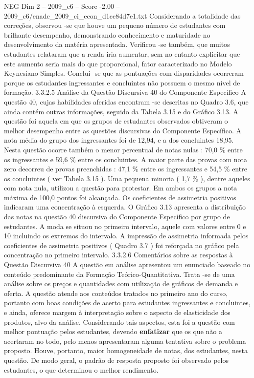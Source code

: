 \begin{textsample}{NEG Dim 2 – 2009\_c6 – Score -2.00 – 2009\_c6/enade\_2009\_ci\_econ\_d1cc84d7e1.txt}
Considerando a totalidade das correções, observou -se que houve um pequeno número de estudantes com brilhante desempenho, demonstrando conhecimento e maturidade no desenvolvimento da matéria apresentada.
Verificou -se também, que muitos estudantes relataram que a renda iria aumentar, sem no entanto explicitar que este aumento seria mais do que proporcional, fator caracterizado no Modelo Keynesiano Simples.
Conclui -se que as pontuações com disparidades ocorreram porque os estudantes ingressantes e concluintes não possuem o mesmo nível de formação. 3.3.2.5 Análise da Questão Discursiva 40 do Componente Específico A questão 40, cujas habilidades aferidas encontram -se descritas no Quadro 3.6, que ainda contém outras informações, seguido da Tabela 3.15 e do Gráfico 3.13.
A questão foi aquela em que os grupos de estudantes observados obtiveram o melhor desempenho entre as questões discursivas do Componente Específico.
A nota média do grupo dos ingressantes foi de 12,94, e a dos concluintes 18,95.
Nesta questão ocorre também o menor percentual de notas nulas : 70,0 \% entre os ingressantes e 59,6 \% entre os concluintes.
A maior parte das provas com nota zero decorreu de provas preenchidas : 47,1 \% entre os ingressantes e 54,5 \% entre os concluintes ( ver Tabela 3.15 ).
Uma pequena minoria ( 1,7 \% ), dentre aqueles com nota nula, utilizou a questão para protestar.
Em ambos os grupos a nota máxima de 100,0 pontos foi alcançada.
Os coeficientes de assimetria positivos indicaram uma concentração à esquerda.
O Gráfico 3.13 apresenta a distribuição das notas na questão 40 discursiva do Componente Específico por grupo de estudantes.
A moda se situou no primeiro intervalo, aquele com valores entre 0 e 10 incluindo os extremos do intervalo.
A impressão de assimetria informada pelos coeficientes de assimetria positivos ( Quadro 3.7 ) foi reforçada no gráfico pela concentração no primeiro intervalo. 3.3.2.6 Comentários sobre as respostas à Questão Discursiva 40 A questão em análise apresentou um enunciado baseado no conteúdo predominante da Formação Teórico-Quantitativa.
Trata -se de uma análise sobre os preços e quantidades com utilização de gráficos de demanda e oferta.
A questão atende aos conteúdos tratados no primeiro ano do curso, portanto com boas condições de acerto para estudantes ingressantes e concluintes, e ainda, oferece margem à interpretação sobre o aspecto de elasticidade dos produtos, alvo da análise.
Considerando tais aspectos, esta foi a questão com melhor pontuação pelos estudantes, devendo \textbf{enfatizar} que os que não a acertaram no todo, pelo menos apresentaram alguma tentativa sobre o problema proposto.
Houve, portanto, maior homogeneidade de notas, dos estudantes, nesta questão.
De modo geral, o padrão de resposta proposto foi observado pelos estudantes, o que determinou o melhor rendimento.

\end{textsample}
